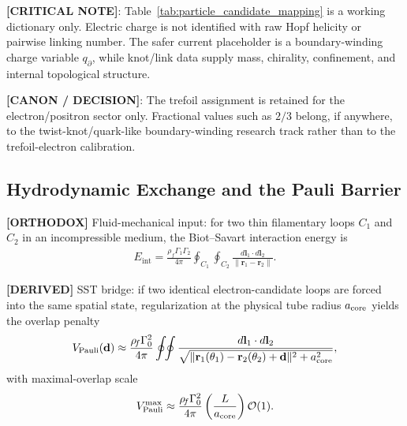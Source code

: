 \documentclass[11pt]{article}
\theoremstyle{definition}
\theoremstyle{plain}
\theoremstyle{remark}
\begin{document}
        \textbf{[CRITICAL NOTE]}: Table~\ref{tab:particle_candidate_mapping} is a working dictionary only. Electric charge is not identified with raw Hopf helicity or pairwise linking number. The safer current placeholder is a boundary-winding charge variable $q_{\partial}$, while knot/link data supply mass, chirality, confinement, and internal topological structure.

        \textbf{[CANON / DECISION]}: The trefoil assignment is retained for the electron/positron sector only. Fractional values such as $2/3$ belong, if anywhere, to the twist-knot/quark-like boundary-winding research track rather than to the trefoil-electron calibration.

    \subsection{Hydrodynamic Exchange and the Pauli Barrier}
        \label{subsec:integration_pauli}

        \textbf{[ORTHODOX]} Fluid-mechanical input: for two thin filamentary loops \(C_1\) and \(C_2\) in an
        incompressible medium, the Biot--Savart interaction energy is \cite{Batchelor1967}
        \begin{align}
            E_{\mathrm{int}}
            =
            \frac{\rho_{\!f}\Gamma_1\Gamma_2}{4\pi}
            \oint_{C_1}\oint_{C_2}
            \frac{d\mathbf{l}_1\cdot d\mathbf{l}_2}
            {\lVert \mathbf{r}_1 - \mathbf{r}_2 \rVert}.
            \label{eq:biot_savart_interaction}
        \end{align}

        \textbf{[DERIVED]} SST bridge: if two identical electron-candidate loops are forced into the same spatial state,
        regularization at the physical tube radius \(a_{\rm core}\) yields the overlap penalty
        \begin{align}
            V_{\mathrm{Pauli}}(\mathbf{d})
            \approx
            \frac{\rho_{\!f}\Gamma_0^2}{4\pi}
            \oint\!\!\oint
            \frac{d\mathbf{l}_1\cdot d\mathbf{l}_2}
            {\sqrt{\lVert \mathbf{r}_1(\theta_1)-\mathbf{r}_2(\theta_2)+\mathbf{d}\rVert^2+a_{\rm core}^2}},
            \label{eq:pauli_barrier_regularized}
        \end{align}
        with maximal-overlap scale
        \begin{align}
            V_{\mathrm{Pauli}}^{\max}
            \approx
            \frac{\rho_{\!f}\Gamma_0^2}{4\pi}\left(\frac{L}{a_{\rm core}}\right)\mathcal{O}(1).
            \label{eq:pauli_barrier_scale}
        \end{align}
\end{document}

